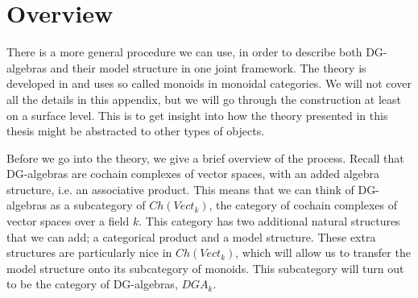 
\section*{Overview}

There is a more general procedure we can use, in order to describe both DG-algebras and their model structure in one joint framework. The theory is developed in \cite{monoid} and uses so called monoids in monoidal categories. We will not cover all the details in this appendix, but we will go through the construction at least on a surface level. This is to get insight into how the theory presented in this thesis might be abstracted to other types of objects. 

Before we go into the theory, we give a brief overview of the process. Recall that DG-algebras are cochain complexes of vector spaces, with an added algebra structure, i.e. an associative product. This means that we can think of DG-algebras as a subcategory of $Ch(Vect_k)$, the category of cochain complexes of vector spaces over a field $k$. This category has two additional natural structures that we can add; a categorical product and a model structure. These extra structures are particularly nice in $Ch(Vect_k)$, which will allow us to transfer the model structure onto its subcategory of monoids. This subcategory will turn out to be the category of DG-algebras, $DGA_k$.



